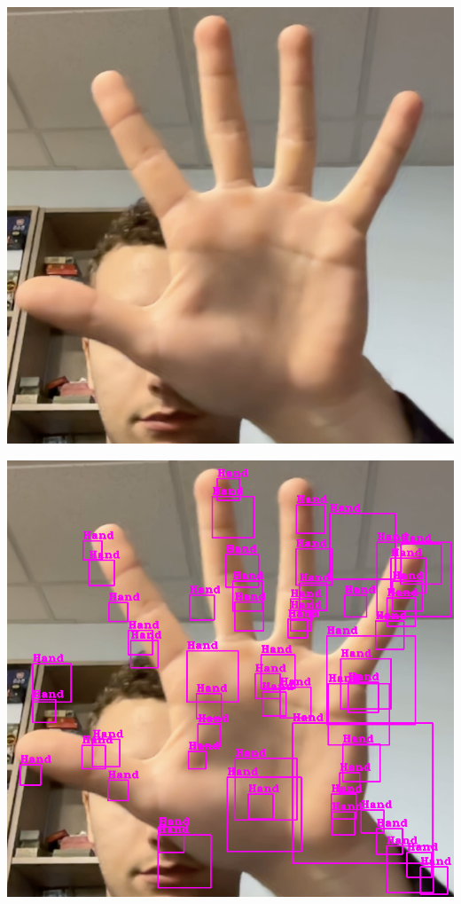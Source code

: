 \documentclass[11pt]{article}
\begin{document}
\begin{minipage}{0.45\textwidth}
    \centering
    \includegraphics[width=\textwidth]{images/cascade2.png}
\end{minipage}
\begin{minipage}{0.45\textwidth}
    \centering
    \includegraphics[width=\textwidth]{images/cascade3.png}
\end{minipage}
\end{document}
